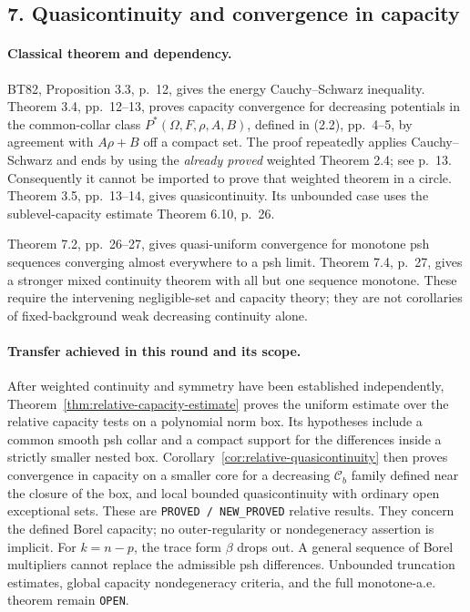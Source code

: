 \documentclass[11pt,a4paper]{article}
\numberwithin{equation}{section}
\theoremstyle{definition}
\theoremstyle{remark}
\begin{document}
\subsection{7. Quasicontinuity and convergence in capacity}

\paragraph{Classical theorem and dependency.}
BT82, Proposition 3.3, p.~12, gives the energy Cauchy--Schwarz inequality.
Theorem 3.4, pp.~12--13, proves capacity convergence for decreasing
potentials in the common-collar class \(P^*(\Omega,F,\rho,A,B)\),
defined in (2.2), pp.~4--5, by agreement with \(A\rho+B\) off a
compact set. The proof repeatedly applies Cauchy--Schwarz and ends by
using the \emph{already proved} weighted Theorem 2.4; see p.~13.
Consequently it cannot be imported to prove that weighted theorem in a
circle. Theorem 3.5, pp.~13--14, gives quasicontinuity. Its unbounded
case uses the sublevel-capacity estimate Theorem 6.10, p.~26.
\cite[Proposition 3.3; Theorems 3.4, 3.5, 6.10]{BT82}

Theorem 7.2, pp.~26--27, gives quasi-uniform convergence for monotone
psh sequences converging almost everywhere to a psh limit. Theorem 7.4,
p.~27, gives a stronger mixed continuity theorem with all but one
sequence monotone. These require the intervening negligible-set and
capacity theory; they are not corollaries of fixed-background weak
decreasing continuity alone.\cite[Theorems 7.2, 7.4]{BT82}

\paragraph{Transfer achieved in this round and its scope.}
After weighted continuity and symmetry have been established independently,
Theorem~\ref{thm:relative-capacity-estimate} proves the uniform estimate
over the relative capacity tests on a polynomial norm box. Its hypotheses
include a common smooth psh collar and a compact support for the differences
inside a strictly smaller nested box. Corollary~\ref{cor:relative-quasicontinuity}
then proves convergence in capacity on a smaller core for a decreasing
\(\mathcal C_b\) family defined near the closure of the box, and local
bounded quasicontinuity with ordinary open exceptional sets. These are
\texttt{PROVED / NEW\_PROVED} relative results. They concern the defined
Borel capacity; no outer-regularity or nondegeneracy assertion is implicit.
For \(k=n-p\), the trace form \(\beta\) drops out. A general sequence of
Borel multipliers cannot replace the admissible psh differences. Unbounded
truncation estimates, global capacity nondegeneracy criteria, and the full
monotone-a.e. theorem remain \texttt{OPEN}.
\end{document}
